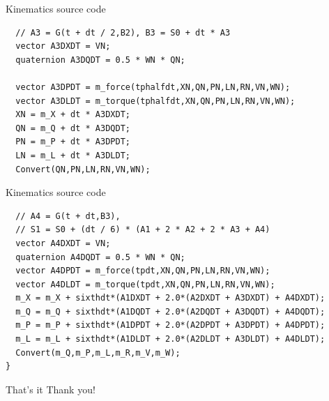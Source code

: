 \documentclass{beamer}
\begin{document}
\begin{frame}[fragile]{Kinematics source code}
\begin{lstlisting}
  // A3 = G(t + dt / 2,B2), B3 = S0 + dt * A3 
  vector A3DXDT = VN; 
  quaternion A3DQDT = 0.5 * WN * QN;

  vector A3DPDT = m_force(tphalfdt,XN,QN,PN,LN,RN,VN,WN); 
  vector A3DLDT = m_torque(tphalfdt,XN,QN,PN,LN,RN,VN,WN); 
  XN = m_X + dt * A3DXDT; 
  QN = m_Q + dt * A3DQDT; 
  PN = m_P + dt * A3DPDT; 
  LN = m_L + dt * A3DLDT; 
  Convert(QN,PN,LN,RN,VN,WN);
\end{lstlisting}
\end{frame}

\begin{frame}[fragile]{Kinematics source code}
\begin{lstlisting}
  // A4 = G(t + dt,B3), 
  // S1 = S0 + (dt / 6) * (A1 + 2 * A2 + 2 * A3 + A4) 
  vector A4DXDT = VN; 
  quaternion A4DQDT = 0.5 * WN * QN; 
  vector A4DPDT = m_force(tpdt,XN,QN,PN,LN,RN,VN,WN); 
  vector A4DLDT = m_torque(tpdt,XN,QN,PN,LN,RN,VN,WN); 
  m_X = m_X + sixthdt*(A1DXDT + 2.0*(A2DXDT + A3DXDT) + A4DXDT); 
  m_Q = m_Q + sixthdt*(A1DQDT + 2.0*(A2DQDT + A3DQDT) + A4DQDT); 
  m_P = m_P + sixthdt*(A1DPDT + 2.0*(A2DPDT + A3DPDT) + A4DPDT); 
  m_L = m_L + sixthdt*(A1DLDT + 2.0*(A2DLDT + A3DLDT) + A4DLDT); 
  Convert(m_Q,m_P,m_L,m_R,m_V,m_W);
}
\end{lstlisting}
\end{frame}


\begin{frame}{That's it}
\center
\fontsize{18pt}{7.2}\selectfont
Thank you!
\end{frame}
\end{document}
